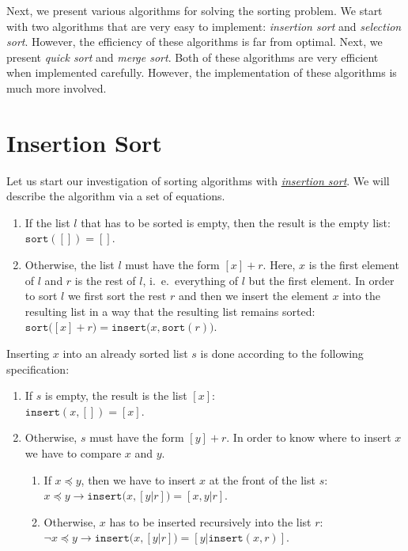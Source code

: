 Next, we present various algorithms for solving the sorting problem.  We start with two algorithms
that are very easy to implement: \emph{insertion sort} and \emph{selection sort}.  However, the
efficiency of these algorithms is far from optimal.  Next, we present \emph{quick sort} and 
\emph{merge sort}.  Both of these algorithms are very efficient when implemented carefully.
However, the implementation of these algorithms is much more involved.


\section{Insertion Sort}
Let us start our investigation of sorting algorithms with
\href{http://en.wikipedia.org/wiki/Insertion_sort}{\emph{insertion sort}}.  We will describe the
algorithm via a set of equations.
\begin{enumerate}
\item If the list $l$ that has to be sorted is empty, then the result is the empty list: 
      \\[0.2cm]
      \hspace*{1.3cm}
      $\mathtt{sort}([]) = []$.
\item Otherwise, the list $l$ must have the form $[x] + r$. Here, $x$ is the first element of $l$
      and $r$ is the rest of $l$, i.~e.~everything of $l$ but the first element.  In order to sort
      $l$ we first sort the rest $r$ and then we insert the element $x$ into the resulting list in a
      way that the resulting list remains sorted:
      \\[0.2cm]
      \hspace*{1.3cm} $\mathtt{sort}\bigl([x] + r\bigr) = \mathtt{insert}\bigl(x, \mathtt{sort}(r)\bigr)$.
\end{enumerate}
Inserting $x$ into an already sorted list $s$ is done according to the following specification:
\begin{enumerate}
\item If $s$ is empty, the result is the list $[x]$: \\[0.2cm]
      \hspace*{1.3cm}
      $\mathtt{insert}(x,[]) = [x]$.
\item Otherwise, $s$ must have the form $[y] + r$.  In order to know where to insert $x$ we have to
      compare $x$ and $y$.
      \begin{enumerate}
      \item If $x \preceq y$, then we have to insert $x$ at the front of the list $s$: \\[0.2cm]
            \hspace*{1.3cm}
            $x \preceq y \rightarrow \mathtt{insert}\bigl(x, [y|r]\bigr) = [x,y|r]$. 
      \item Otherwise, $x$ has to be inserted recursively into the list $r$: \\[0.2cm]
            \hspace*{1.3cm}
            $\neg x \preceq y \rightarrow \mathtt{insert}\bigl(x, [y|r]\bigr) = [y | \mathtt{insert}(x,r)]$. 
      \end{enumerate}
\end{enumerate}

